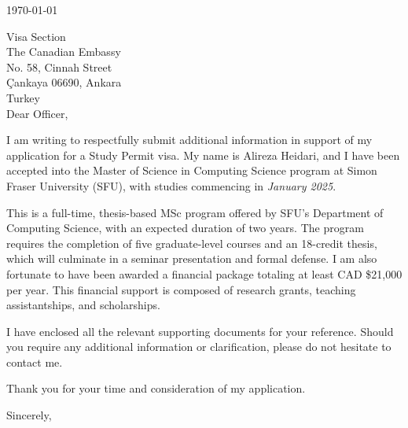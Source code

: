 \thispagestyle{plain}

\noindent
\today

\noindent
Visa Section \\
The Canadian Embassy \\
No. 58, Cinnah Street \\
Çankaya 06690, Ankara \\
Turkey \\

Dear Officer,

I am writing to respectfully submit additional information in support of my application for a Study Permit visa. My name is Alireza Heidari, and I have been accepted into the Master of Science in Computing Science program at Simon Fraser University (SFU), with studies commencing in \textit{January 2025}.

This is a full-time, thesis-based MSc program offered by SFU’s Department of Computing Science, with an expected duration of two years. The program requires the completion of five graduate-level courses and an 18-credit thesis, which will culminate in a seminar presentation and formal defense. I am also fortunate to have been awarded a financial package totaling at least CAD \$21,000 per year. This financial support is composed of research grants, teaching assistantships, and scholarships.


I have enclosed all the relevant supporting documents for your reference. Should you require any additional information or clarification, please do not hesitate to contact me.


Thank you for your time and consideration of my application.


\noindent
Sincerely,\\
\applicantName

\clearpage
